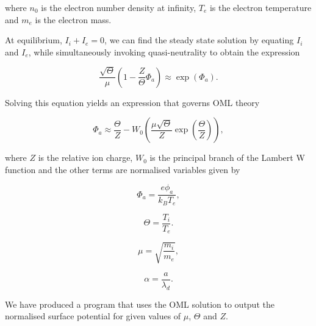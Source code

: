\documentclass[journal]{Imperial_lab_report}
\begin{document}
\noindent where $n_{0}$ is the electron number density at infinity, $T_{e}$ is the electron temperature and $m_{e}$ is the electron mass.

\smallskip

At equilibrium, $I_{i} + I_{e} = 0$, we can find the steady state solution by equating $I_{i}$ and $I_{e}$, while simultaneously invoking quasi-neutrality to obtain the expression

\begin{equation}\label{eq:OMLeqn}
\frac{\sqrt{\Theta}}{\mu} \left(1 - \frac{Z}{\Theta}\Phi_a \right) \approx \exp{\left(\Phi_a\right)}.
\end{equation}

\medskip

\noindent Solving this equation yields an expression that governs OML theory

\begin{equation}\label{eq:OMLsol}
\Phi_{a} \approx \frac{\Theta}{Z} - W_{0}\left(\frac{\mu\sqrt{\Theta}}{Z} \exp{\left(\frac{\Theta}{Z}\right)}\right),
\end{equation}

\noindent where $Z$ is the relative ion charge, $W_{0}$ is the principal branch of the Lambert W function \cite{Thomas} and the other terms are normalised variables given by 

\begin{equation}\label{eq:Nphi}
\Phi_{a} = \frac{e\phi_{a}}{k_{B}T_{e}},
\end{equation}

\begin{equation}\label{eq:Theta}
\Theta = \frac{T_{i}}{T_{e}}.
\end{equation}

\begin{equation}\label{eq:Mu}
\mu = \sqrt{\frac{m_{i}}{m_{e}}} ,
\end{equation}

\begin{equation}\label{eq:Alpha}
\alpha = \frac{a}{\lambda_d}.
\end{equation}

\medskip

We have produced a program that uses the OML solution to output the normalised surface potential for given values of $\mu$, $\Theta$ and $Z$. 
\end{document}
